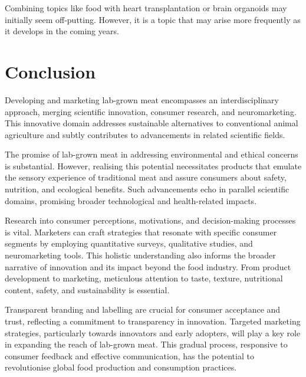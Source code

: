 \documentclass[10pt]{article}
\begin{document}
\begin{sloppypar}
  Combining topics like food with heart transplantation or brain organoids may initially seem off-putting. However, it is a topic that may arise more frequently as it develops in the coming years.

  \section{Conclusion}
  \label{sec:conclusion}
  Developing and marketing lab-grown meat encompasses an interdisciplinary approach, merging scientific innovation, consumer research, and neuromarketing. This innovative domain addresses sustainable alternatives to conventional animal agriculture and subtly contributes to advancements in related scientific fields.

  The promise of lab-grown meat in addressing environmental and ethical concerns is substantial. However, realising this potential necessitates products that emulate the sensory experience of traditional meat and assure consumers about safety, nutrition, and ecological benefits. Such advancements echo in parallel scientific domains, promising broader technological and health-related impacts.

  Research into consumer perceptions, motivations, and decision-making processes is vital. Marketers can craft strategies that resonate with specific consumer segments by employing quantitative surveys, qualitative studies, and neuromarketing tools. This holistic understanding also informs the broader narrative of innovation and its impact beyond the food industry. From product development to marketing, meticulous attention to taste, texture, nutritional content, safety, and sustainability is essential.

  Transparent branding and labelling are crucial for consumer acceptance and trust, reflecting a commitment to transparency in innovation. Targeted marketing strategies, particularly towards innovators and early adopters, will play a key role in expanding the reach of lab-grown meat. This gradual process, responsive to consumer feedback and effective communication, has the potential to revolutionise global food production and consumption practices.

  \pagebreak
  \singlespacing %
  
  

\end{sloppypar}
\end{document}
